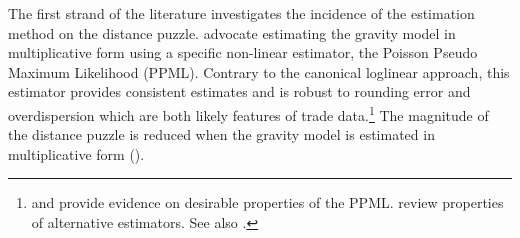 \documentclass[12pt,twoside,a4paper,notitlepage]{article}
\begin{document}
The first strand of the literature investigates the incidence of the estimation method on the distance puzzle.
\cite{SantosSilva2006} advocate estimating the gravity model in multiplicative form using a specific non-linear estimator, the Poisson Pseudo Maximum Likelihood (PPML).
Contrary to the canonical loglinear approach, this estimator provides consistent estimates and is robust to rounding error and overdispersion which are both likely features of trade data.\footnote{\cite{SantosSilva2011} and \cite{Fally2015} provide evidence on desirable properties of the PPML.
\cite{Head2014} review properties of alternative estimators.
See also \cite{Bosquet2015,Bosquet2014}.}
The magnitude of the distance puzzle is reduced when the gravity model is estimated in multiplicative form (\cite{Bosquet2015, Head2013}).

%
\end{document}
